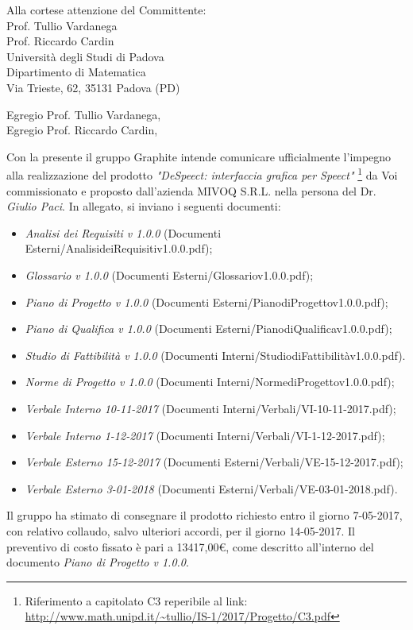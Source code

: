 \documentclass[]{letter}
\begin{document}
\begin{letter}{
		Alla cortese attenzione del Committente: \\
		Prof. Tullio Vardanega \\
		Prof. Riccardo Cardin \\
		Università degli Studi di Padova \\
		Dipartimento di Matematica \\ 
		Via Trieste, 62, 35131 Padova (PD)
	}

\opening{Egregio Prof. Tullio Vardanega, \\ Egregio Prof. Riccardo Cardin,}

Con la presente il gruppo Graphite intende comunicare ufficialmente l’impegno alla realizzazione del prodotto  \textit{"DeSpeect: interfaccia grafica per Speect"} \footnote{Riferimento a capitolato C3 reperibile al link: \url{http://www.math.unipd.it/~tullio/IS-1/2017/Progetto/C3.pdf}} da Voi commissionato e proposto dall'azienda MIVOQ S.R.L. nella persona del Dr. \textit{Giulio Paci}.  In  allegato,  si inviano i seguenti documenti:

\begin{itemize}
	\item \textit{Analisi dei Requisiti v 1.0.0} (Documenti Esterni/AnalisideiRequisitiv1.0.0.pdf);
	\item \textit{Glossario v 1.0.0} (Documenti Esterni/Glossariov1.0.0.pdf);
	\item \textit{Piano di Progetto v 1.0.0} (Documenti Esterni/PianodiProgettov1.0.0.pdf);
	\item \textit{Piano di Qualifica v 1.0.0} (Documenti Esterni/PianodiQualificav1.0.0.pdf);
	\item \textit{Studio di Fattibilità v 1.0.0} (Documenti Interni/StudiodiFattibilitàv1.0.0.pdf).
	\item \textit{Norme di Progetto v 1.0.0} (Documenti Interni/NormediProgettov1.0.0.pdf);
	\item \textit{Verbale Interno 10-11-2017} (Documenti Interni/Verbali/VI-10-11-2017.pdf);
	\item \textit{Verbale Interno 1-12-2017} (Documenti Interni/Verbali/VI-1-12-2017.pdf);
	\item \textit{Verbale Esterno 15-12-2017} (Documenti Esterni/Verbali/VE-15-12-2017.pdf);
	\item \textit{Verbale Esterno 3-01-2018} (Documenti Esterni/Verbali/VE-03-01-2018.pdf).
\end{itemize}

Il gruppo ha stimato di consegnare il prodotto richiesto entro il giorno 7-05-2017, con relativo collaudo, salvo ulteriori accordi, per il giorno 14-05-2017. Il preventivo di costo fissato è pari a 13417,00\euro, come descritto all’interno del documento \textit{Piano di Progetto v 1.0.0}.


\end{letter}
\end{document}
